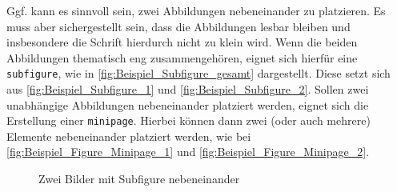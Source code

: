 Ggf. kann es sinnvoll sein, zwei Abbildungen nebeneinander zu platzieren. Es muss aber sichergestellt sein, dass die Abbildungen lesbar bleiben und insbesondere die Schrift hierdurch nicht zu klein wird. Wenn die beiden Abbildungen thematisch eng zusammengehören, eignet sich hierfür eine \texttt{subfigure}, wie in \autoref{fig:Beispiel_Subfigure_gesamt} dargestellt. Diese setzt sich aus \autoref{fig:Beispiel_Subfigure_1} und \autoref{fig:Beispiel_Subfigure_2}. Sollen zwei unabhängige Abbildungen nebeneinander platziert werden, eignet sich die Erstellung einer \texttt{minipage}. Hierbei können dann zwei (oder auch mehrere) Elemente nebeneinander platziert werden, wie bei \autoref{fig:Beispiel_Figure_Minipage_1} und \autoref{fig:Beispiel_Figure_Minipage_2}.

\begin{figure}[H]
    \begin{subfigure}[c]{0.49\textwidth}
        \label{fig:Beispiel_Subfigure_1}
    \end{subfigure}
    \begin{subfigure}[c]{0.49\textwidth}
        \label{fig:Beispiel_Subfigure_2}
    \end{subfigure}
    \caption{Zwei Bilder mit Subfigure nebeneinander}
    \label{fig:Beispiel_Subfigure_gesamt}
\end{figure}


\begin{figure}[H]
    \centering
    \begin{minipage}{.5\textwidth}
        \centering
        \label{fig:Beispiel_Figure_Minipage_1}
    \end{minipage}%
    \begin{minipage}{.5\textwidth}
          \centering
          \label{fig:Beispiel_Figure_Minipage_2}
    \end{minipage}
\end{figure}



